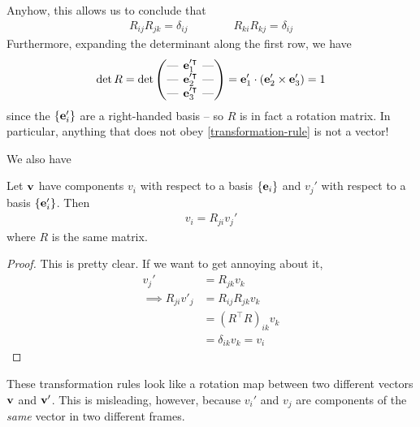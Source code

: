 \documentclass{../../template/note}
\begin{document}
    Anyhow, this allows us to conclude that
    \begin{align*}
        R_{ij} R_{jk} = \delta_{ij} \qquad \qquad R_{ki} R_{kj} = \delta_{ij}
    \end{align*}
    Furthermore, expanding the determinant along the first row, we have
    \begin{align*}
        \det R = \det \begin{pmatrix}
            \lln & \V e_1'^\intercal & \rln \\ 
            \lln & \V e_2'^\intercal  & \rln \\ 
            \lln & \V e_3'^\intercal & \rln \\ 
        \end{pmatrix} = \V e_1' \cdot (\V e_2' \times \V e_3') = 1
    \end{align*}
    since the \(\{\V e_i'\}\) are a right-handed basis -- so \(R\) is in fact a rotation matrix. In particular, anything that does not obey \cref{transformation-rule} is not a vector!

    We also have
    \begin{proposition}
        Let \(\V v\) have components \(v_i\) with respect to a basis \(\{\V e_i\}\) and \(v_j'\) with respect to a basis \(\{\V e_i'\}\). Then
        \begin{align*}
            v_i = R_{ji} v_j'
        \end{align*}
        where \(R\) is the same matrix.
    \end{proposition}
    
    \begin{proof}
        This is pretty clear. If we want to get annoying about it,
        \begin{align*}
            v_j' &= R_{jk} v_k \\
            \implies R_{ji} v'_j &= R_{ij} R_{jk} v_k \\
            &= (R^\intercal R)_{ik} v_k \\
            &= \delta_{ik} v_k = v_i
        \end{align*}
    \end{proof}
    
    \begin{remark*}
        These transformation rules look like a rotation map between two different vectors \(\V v\) and \(\V v'\). This is misleading, however, because \(v_i'\) and \(v_j\) are components of the \emph{same} vector in two different frames.
    \end{remark*}
    
\end{document}
